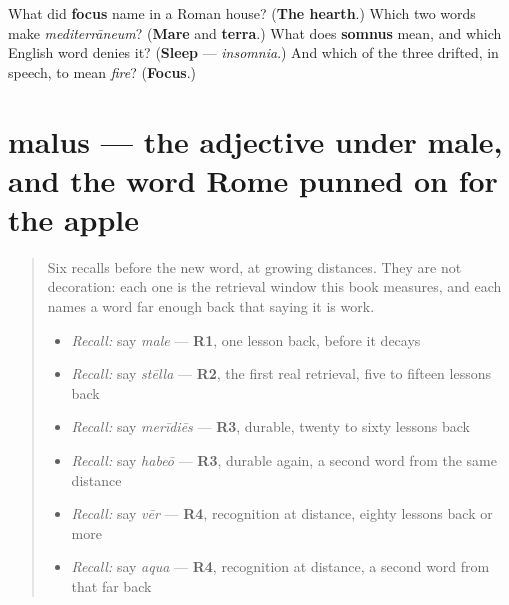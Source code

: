 \begin{tcolorbox}[breakable,colback=teal!4,colframe=teal!35!black,title={Before you move on}]
What did \textbf{focus} name in a Roman house? (\textbf{The hearth}.) Which two words make \emph{mediterrāneum}? (\textbf{Mare} and \textbf{terra}.) What does \textbf{somnus} mean, and which English word denies it? (\textbf{Sleep} — \emph{insomnia}.) And which of the three drifted, in speech, to mean \emph{fire}? (\textbf{Focus}.)
\end{tcolorbox}
\section[malus, mala, malum]{malus — the adjective under male, and the word Rome punned on for the apple}

\label{lesson:LA-C48-malus}



\begin{quote}
Six recalls before the new word, at growing distances. They are not decoration: each one is the retrieval window this book measures, and each names a word far enough back that saying it is work.

\begin{itemize}
\raggedright
  \item \emph{Recall:} say \emph{male} — \textbf{R1}, one lesson back, before it decays
  \item \emph{Recall:} say \emph{stēlla} — \textbf{R2}, the first real retrieval, five to fifteen lessons back
  \item \emph{Recall:} say \emph{merīdiēs} — \textbf{R3}, durable, twenty to sixty lessons back
  \item \emph{Recall:} say \emph{habeō} — \textbf{R3}, durable again, a second word from the same distance
  \item \emph{Recall:} say \emph{vēr} — \textbf{R4}, recognition at distance, eighty lessons back or more
  \item \emph{Recall:} say \emph{aqua} — \textbf{R4}, recognition at distance, a second word from that far back
\end{itemize}
\end{quote}

